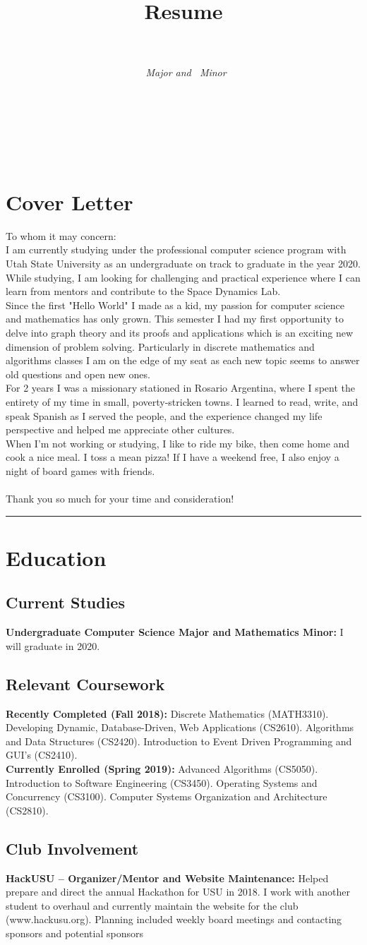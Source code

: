 \documentclass[letterpaper]{article}
\title{Resume}
\author{
	\authorName \\
	\begin{small}
		\textit{\myMajor\ Major and \myMinor\ Minor}
	\end{small}\\
	\noindent\rule{2in}{0.4pt}\\
	\email \\
	\phone
}
\date{\assignmentDate}
\newcommand{\coverLetter} {
	\noindent To whom it may concern:\\
	
	\noindent I am currently studying under the professional computer science program with Utah State University as an undergraduate on track to graduate in the year 2020. While studying, I am looking for challenging and practical experience where I can learn from mentors and contribute to the Space Dynamics Lab.\\
	
	\noindent Since the first "Hello World" I made as a kid, my passion for computer science and mathematics has only grown. This semester I had my first opportunity to delve into graph theory and its proofs and applications which is an exciting new dimension of problem solving. Particularly in discrete mathematics and algorithms classes I am on the edge of my seat as each new topic seems to answer old questions and open new ones.\\
	
	\noindent For 2 years I was a missionary stationed in Rosario Argentina, where I spent the entirety of my time in small, poverty-stricken towns. I learned to read, write, and speak Spanish as I served the people, and the experience changed my life perspective and helped me appreciate other cultures.\\
	
	\noindent When I'm not working or studying, I like to ride my bike, then come home and cook a nice meal. I toss a mean pizza! If I have a weekend free, I also enjoy a night of board games with friends.\\\\
	
	\noindent Thank you so much for your time and consideration! 
}
\begin{document}
\maketitle

\section{Cover Letter} %

\coverLetter

\noindent\rule{2in}{0.4pt}


\clearpage

\section{Education}

\subsection{Current Studies}
\textbf{Undergraduate Computer Science Major and Mathematics Minor: } I will graduate in 2020.

\subsection{Relevant Coursework}
\textbf{Recently Completed (Fall 2018): } Discrete Mathematics (MATH3310). Developing Dynamic, Database-Driven, Web Applications (CS2610). Algorithms and Data Structures (CS2420). Introduction to Event Driven Programming and GUI's (CS2410).\\

\noindent\textbf{Currently Enrolled (Spring 2019): } Advanced Algorithms (CS5050). Introduction to Software Engineering (CS3450). Operating Systems and Concurrency (CS3100). Computer Systems Organization and Architecture (CS2810).

\subsection{Club Involvement}

\textbf{HackUSU -- Organizer/Mentor and Website Maintenance: } Helped prepare and direct the annual Hackathon for USU in 2018. I work with another student to overhaul and currently maintain the website for the club (www.hackusu.org). Planning included weekly board meetings and contacting sponsors and potential sponsors \\
\end{document}

